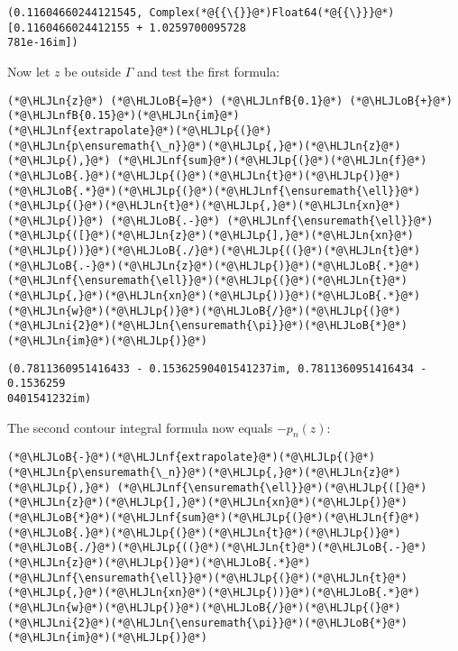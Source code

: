 \documentclass[12pt,a4paper]{article}
\newcommand{\HLJLn}[1]{#1}
\newcommand{\HLJLnf}[1]{\textcolor[RGB]{66,102,213}{#1}}
\newcommand{\HLJLnfB}[1]{\textcolor[RGB]{59,151,46}{#1}}
\newcommand{\HLJLni}[1]{\textcolor[RGB]{59,151,46}{#1}}
\newcommand{\HLJLoB}[1]{\textcolor[RGB]{102,102,102}{\textbf{#1}}}
\newcommand{\HLJLp}[1]{#1}
\begin{document}
\begin{lstlisting}
(0.11604660244121545, Complex(*@{{\{}}@*)Float64(*@{{\}}}@*)[0.1160466024412155 + 1.0259700095728
781e-16im])
\end{lstlisting}


Now let $z$ be outside $\Gamma$ and test the first formula:


\begin{lstlisting}
(*@\HLJLn{z}@*) (*@\HLJLoB{=}@*) (*@\HLJLnfB{0.1}@*) (*@\HLJLoB{+}@*) (*@\HLJLnfB{0.15}@*)(*@\HLJLn{im}@*)
(*@\HLJLnf{extrapolate}@*)(*@\HLJLp{(}@*)(*@\HLJLn{p\ensuremath{\_n}}@*)(*@\HLJLp{,}@*)(*@\HLJLn{z}@*)(*@\HLJLp{),}@*) (*@\HLJLnf{sum}@*)(*@\HLJLp{(}@*)(*@\HLJLn{f}@*)(*@\HLJLoB{.}@*)(*@\HLJLp{(}@*)(*@\HLJLn{t}@*)(*@\HLJLp{)}@*)(*@\HLJLoB{.*}@*)(*@\HLJLp{(}@*)(*@\HLJLnf{\ensuremath{\ell}}@*)(*@\HLJLp{(}@*)(*@\HLJLn{t}@*)(*@\HLJLp{,}@*)(*@\HLJLn{xn}@*)(*@\HLJLp{)}@*) (*@\HLJLoB{.-}@*) (*@\HLJLnf{\ensuremath{\ell}}@*)(*@\HLJLp{([}@*)(*@\HLJLn{z}@*)(*@\HLJLp{],}@*)(*@\HLJLn{xn}@*)(*@\HLJLp{))}@*)(*@\HLJLoB{./}@*)(*@\HLJLp{((}@*)(*@\HLJLn{t}@*)(*@\HLJLoB{.-}@*)(*@\HLJLn{z}@*)(*@\HLJLp{)}@*)(*@\HLJLoB{.*}@*)(*@\HLJLnf{\ensuremath{\ell}}@*)(*@\HLJLp{(}@*)(*@\HLJLn{t}@*)(*@\HLJLp{,}@*)(*@\HLJLn{xn}@*)(*@\HLJLp{))}@*)(*@\HLJLoB{.*}@*)(*@\HLJLn{w}@*)(*@\HLJLp{)}@*)(*@\HLJLoB{/}@*)(*@\HLJLp{(}@*)(*@\HLJLni{2}@*)(*@\HLJLn{\ensuremath{\pi}}@*)(*@\HLJLoB{*}@*)(*@\HLJLn{im}@*)(*@\HLJLp{)}@*)
\end{lstlisting}

\begin{lstlisting}
(0.7811360951416433 - 0.15362590401541237im, 0.7811360951416434 - 0.1536259
0401541232im)
\end{lstlisting}


The second contour integral formula now equals $-p_n(z)$:


\begin{lstlisting}
(*@\HLJLoB{-}@*)(*@\HLJLnf{extrapolate}@*)(*@\HLJLp{(}@*)(*@\HLJLn{p\ensuremath{\_n}}@*)(*@\HLJLp{,}@*)(*@\HLJLn{z}@*)(*@\HLJLp{),}@*) (*@\HLJLnf{\ensuremath{\ell}}@*)(*@\HLJLp{([}@*)(*@\HLJLn{z}@*)(*@\HLJLp{],}@*)(*@\HLJLn{xn}@*)(*@\HLJLp{)}@*)(*@\HLJLoB{*}@*)(*@\HLJLnf{sum}@*)(*@\HLJLp{(}@*)(*@\HLJLn{f}@*)(*@\HLJLoB{.}@*)(*@\HLJLp{(}@*)(*@\HLJLn{t}@*)(*@\HLJLp{)}@*)(*@\HLJLoB{./}@*)(*@\HLJLp{((}@*)(*@\HLJLn{t}@*)(*@\HLJLoB{.-}@*)(*@\HLJLn{z}@*)(*@\HLJLp{)}@*)(*@\HLJLoB{.*}@*)(*@\HLJLnf{\ensuremath{\ell}}@*)(*@\HLJLp{(}@*)(*@\HLJLn{t}@*)(*@\HLJLp{,}@*)(*@\HLJLn{xn}@*)(*@\HLJLp{))}@*)(*@\HLJLoB{.*}@*)(*@\HLJLn{w}@*)(*@\HLJLp{)}@*)(*@\HLJLoB{/}@*)(*@\HLJLp{(}@*)(*@\HLJLni{2}@*)(*@\HLJLn{\ensuremath{\pi}}@*)(*@\HLJLoB{*}@*)(*@\HLJLn{im}@*)(*@\HLJLp{)}@*)
\end{lstlisting}
\end{document}

